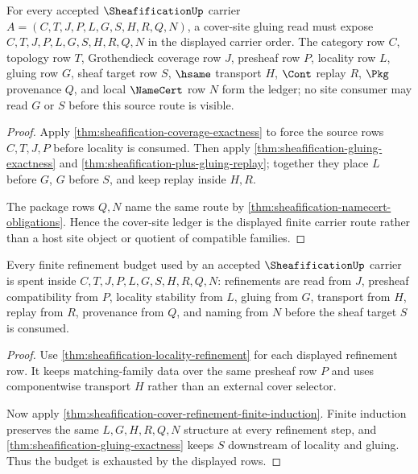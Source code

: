 \begin{theorem}
\label{thm:sheafification-cover-site-gluing-ledger}
For every accepted $\SheafificationUp$ carrier $A=(C,T,J,P,L,G,S,H,R,Q,N)$, a cover-site gluing read must expose $C,T,J,P,L,G,S,H,R,Q,N$ in the displayed carrier order. The category row $C$, topology row $T$, Grothendieck coverage row $J$, presheaf row $P$, locality row $L$, gluing row $G$, sheaf target row $S$, $\hsame$ transport $H$, $\Cont$ replay $R$, $\Pkg$ provenance $Q$, and local $\NameCert$ row $N$ form the ledger; no site consumer may read $G$ or $S$ before this source route is visible.
\end{theorem}
\begin{proof}
Apply \autoref{thm:sheafification-coverage-exactness} to force the source rows $C,T,J,P$ before locality is consumed. Then apply \autoref{thm:sheafification-gluing-exactness} and \autoref{thm:sheafification-plus-gluing-replay}; together they place $L$ before $G$, $G$ before $S$, and keep replay inside $H,R$.

The package rows $Q,N$ name the same route by \autoref{thm:sheafification-namecert-obligations}. Hence the cover-site ledger is the displayed finite carrier route rather than a host site object or quotient of compatible families.
\end{proof}

\begin{theorem}
\label{thm:sheafification-refinement-stability-budget}
Every finite refinement budget used by an accepted $\SheafificationUp$ carrier is spent inside $C,T,J,P,L,G,S,H,R,Q,N$: refinements are read from $J$, presheaf compatibility from $P$, locality stability from $L$, gluing from $G$, transport from $H$, replay from $R$, provenance from $Q$, and naming from $N$ before the sheaf target $S$ is consumed.
\end{theorem}
\begin{proof}
Use \autoref{thm:sheafification-locality-refinement} for each displayed refinement row. It keeps matching-family data over the same presheaf row $P$ and uses componentwise transport $H$ rather than an external cover selector.

Now apply \autoref{thm:sheafification-cover-refinement-finite-induction}. Finite induction preserves the same $L,G,H,R,Q,N$ structure at every refinement step, and \autoref{thm:sheafification-gluing-exactness} keeps $S$ downstream of locality and gluing. Thus the budget is exhausted by the displayed rows.
\end{proof}

